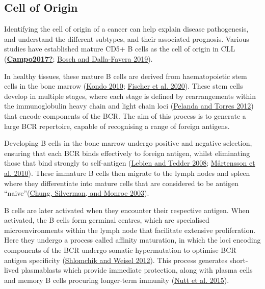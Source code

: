 \documentclass[11pt, a4paper, twosided]{book}
\begin{document}
\hypertarget{intro-cell-of-origin}{%
\subsection{Cell of Origin}\label{intro-cell-of-origin}}

Identifying the cell of origin of a cancer can help explain disease pathogenesis, and understand the different subtypes, and their associated prognosis. Various studies have established mature CD5+ B cells as the cell of origin in CLL (\protect\hyperlink{ref-Campo2017}{\textbf{Campo2017?}}; \protect\hyperlink{ref-Bosch2019}{Bosch and Dalla-Favera 2019}).

In healthy tissues, these mature B cells are derived from haematopoietic stem cells in the bone marrow (\protect\hyperlink{ref-Kondo2010}{Kondo 2010}; \protect\hyperlink{ref-Fischer2020}{Fischer et al. 2020}). These stem cells develop in multiple stages, where each stage is defined by rearrangements within the immunoglobulin heavy chain and light chain loci (\protect\hyperlink{ref-Pelanda2012}{Pelanda and Torres 2012}) that encode components of the BCR. The aim of this process is to generate a large BCR repertoire, capable of recognising a range of foreign antigens.

Developing B cells in the bone marrow undergo positive and negative selection, ensuring that each BCR binds effectively to foreign antigen, whilst eliminating those that bind strongly to self-antigen (\protect\hyperlink{ref-Lebien2008}{Lebien and Tedder 2008}; \protect\hyperlink{ref-Martensson2010}{Mårtensson et al. 2010}). These immature B cells then migrate to the lymph nodes and spleen where they differentiate into mature cells that are considered to be antigen ``naive''(\protect\hyperlink{ref-Chung2003}{Chung, Silverman, and Monroe 2003}).

B cells are later activated when they encounter their respective antigen. When activated, the B cells form germinal centres, which are specialised microenvironments within the lymph node that facilitate extensive proliferation. Here they undergo a process called affinity maturation, in which the loci encoding components of the BCR undergo somatic hypermutation to optimise BCR antigen specificity (\protect\hyperlink{ref-Shlomchik2012}{Shlomchik and Weisel 2012}). This process generates short-lived plasmablasts which provide immediate protection, along with plasma cells and memory B cells procuring longer-term immunity (\protect\hyperlink{ref-Nutt2015}{Nutt et al. 2015}).
\end{document}
